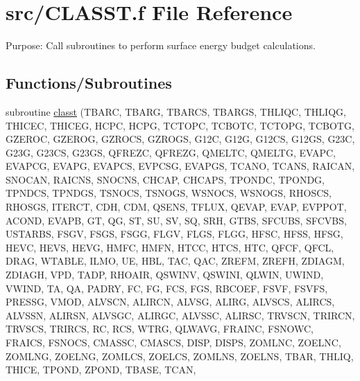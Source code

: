 \hypertarget{CLASST_8f}{}\section{src/\+C\+L\+A\+S\+S\+T.f File Reference}
\label{CLASST_8f}


Purpose\+: Call subroutines to perform surface energy budget calculations.  


\subsection*{Functions/\+Subroutines}
\begin{DoxyCompactItemize}
\item 
subroutine \hyperlink{CLASST_8f_afc821376816034a0c657e69bb4b06a24}{classt} (T\+B\+A\+R\+C, T\+B\+A\+R\+G, T\+B\+A\+R\+C\+S, T\+B\+A\+R\+G\+S, T\+H\+L\+I\+Q\+C, T\+H\+L\+I\+Q\+G, T\+H\+I\+C\+E\+C, T\+H\+I\+C\+E\+G, H\+C\+P\+C, H\+C\+P\+G, T\+C\+T\+O\+P\+C, T\+C\+B\+O\+T\+C, T\+C\+T\+O\+P\+G, T\+C\+B\+O\+T\+G, G\+Z\+E\+R\+O\+C, G\+Z\+E\+R\+O\+G, G\+Z\+R\+O\+C\+S, G\+Z\+R\+O\+G\+S, G12\+C, G12\+G, G12\+C\+S, G12\+G\+S, G23\+C, G23\+G, G23\+C\+S, G23\+G\+S, Q\+F\+R\+E\+Z\+C, Q\+F\+R\+E\+Z\+G, Q\+M\+E\+L\+T\+C, Q\+M\+E\+L\+T\+G, E\+V\+A\+P\+C, E\+V\+A\+P\+C\+G, E\+V\+A\+P\+G, E\+V\+A\+P\+C\+S, E\+V\+P\+C\+S\+G, E\+V\+A\+P\+G\+S, T\+C\+A\+N\+O, T\+C\+A\+N\+S, R\+A\+I\+C\+A\+N, S\+N\+O\+C\+A\+N, R\+A\+I\+C\+N\+S, S\+N\+O\+C\+N\+S, C\+H\+C\+A\+P, C\+H\+C\+A\+P\+S, T\+P\+O\+N\+D\+C, T\+P\+O\+N\+D\+G, T\+P\+N\+D\+C\+S, T\+P\+N\+D\+G\+S, T\+S\+N\+O\+C\+S, T\+S\+N\+O\+G\+S, W\+S\+N\+O\+C\+S, W\+S\+N\+O\+G\+S, R\+H\+O\+S\+C\+S, R\+H\+O\+S\+G\+S, I\+T\+E\+R\+C\+T, C\+D\+H, C\+D\+M, Q\+S\+E\+N\+S, T\+F\+L\+U\+X, Q\+E\+V\+A\+P, E\+V\+A\+P, E\+V\+P\+P\+O\+T, A\+C\+O\+N\+D, E\+V\+A\+P\+B, G\+T, Q\+G, S\+T, S\+U, S\+V, S\+Q, S\+R\+H, G\+T\+B\+S, S\+F\+C\+U\+B\+S, S\+F\+C\+V\+B\+S, U\+S\+T\+A\+R\+B\+S, F\+S\+G\+V, F\+S\+G\+S, F\+S\+G\+G, F\+L\+G\+V, F\+L\+G\+S, F\+L\+G\+G, H\+F\+S\+C, H\+F\+S\+S, H\+F\+S\+G, H\+E\+V\+C, H\+E\+V\+S, H\+E\+V\+G, H\+M\+F\+C, H\+M\+F\+N, H\+T\+C\+C, H\+T\+C\+S, H\+T\+C, Q\+F\+C\+F, Q\+F\+C\+L, D\+R\+A\+G, W\+T\+A\+B\+L\+E, I\+L\+M\+O, U\+E, H\+B\+L, T\+A\+C, Q\+A\+C, Z\+R\+E\+F\+M, Z\+R\+E\+F\+H, Z\+D\+I\+A\+G\+M, Z\+D\+I\+A\+G\+H, V\+P\+D, T\+A\+D\+P, R\+H\+O\+A\+I\+R, Q\+S\+W\+I\+N\+V, Q\+S\+W\+I\+N\+I, Q\+L\+W\+I\+N, U\+W\+I\+N\+D, V\+W\+I\+N\+D, T\+A, Q\+A, P\+A\+D\+R\+Y, F\+C, F\+G, F\+C\+S, F\+G\+S, R\+B\+C\+O\+E\+F, F\+S\+V\+F, F\+S\+V\+F\+S, P\+R\+E\+S\+S\+G, V\+M\+O\+D, A\+L\+V\+S\+C\+N, A\+L\+I\+R\+C\+N, A\+L\+V\+S\+G, A\+L\+I\+R\+G, A\+L\+V\+S\+C\+S, A\+L\+I\+R\+C\+S, A\+L\+V\+S\+S\+N, A\+L\+I\+R\+S\+N, A\+L\+V\+S\+G\+C, A\+L\+I\+R\+G\+C, A\+L\+V\+S\+S\+C, A\+L\+I\+R\+S\+C, T\+R\+V\+S\+C\+N, T\+R\+I\+R\+C\+N, T\+R\+V\+S\+C\+S, T\+R\+I\+R\+C\+S, R\+C, R\+C\+S, W\+T\+R\+G, Q\+L\+W\+A\+V\+G, F\+R\+A\+I\+N\+C, F\+S\+N\+O\+W\+C, F\+R\+A\+I\+C\+S, F\+S\+N\+O\+C\+S, C\+M\+A\+S\+S\+C, C\+M\+A\+S\+C\+S, D\+I\+S\+P, D\+I\+S\+P\+S, Z\+O\+M\+L\+N\+C, Z\+O\+E\+L\+N\+C, Z\+O\+M\+L\+N\+G, Z\+O\+E\+L\+N\+G, Z\+O\+M\+L\+C\+S, Z\+O\+E\+L\+C\+S, Z\+O\+M\+L\+N\+S, Z\+O\+E\+L\+N\+S, T\+B\+A\+R, T\+H\+L\+I\+Q, T\+H\+I\+C\+E, T\+P\+O\+N\+D, Z\+P\+O\+N\+D, T\+B\+A\+S\+E, T\+C\+A\+N, 
\end{DoxyCompactItemize}
